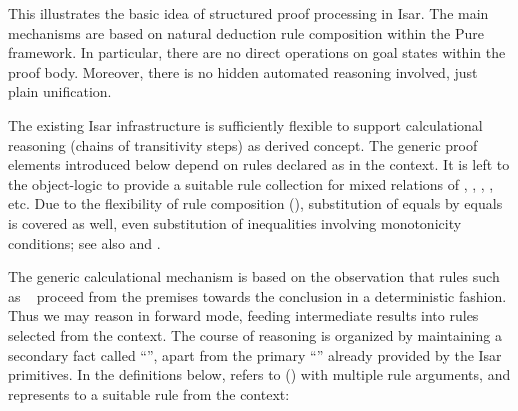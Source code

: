 \begin{isabellebody}
\begin{isamarkuptext}
  \medskip This illustrates the basic idea of structured proof
  processing in Isar.  The main mechanisms are based on natural
  deduction rule composition within the Pure framework.  In
  particular, there are no direct operations on goal states within the
  proof body.  Moreover, there is no hidden automated reasoning
  involved, just plain unification.%
\end{isamarkuptext}%
\isamarkuptrue%
%
\isamarkuptrue%
%
\begin{isamarkuptext}%
The existing Isar infrastructure is sufficiently flexible to support
  calculational reasoning (chains of transitivity steps) as derived
  concept.  The generic proof elements introduced below depend on
  rules declared as \hyperlink{attribute.trans}{\mbox{}} in the context.  It is left to
  the object-logic to provide a suitable rule collection for mixed
  relations of , , , ,
   etc.  Due to the flexibility of rule composition
  (), substitution of equals by
  equals is covered as well, even substitution of inequalities
  involving monotonicity conditions; see also \cite[\S6]{Wenzel-PhD}
  and \cite{Bauer-Wenzel:2001}.

  The generic calculational mechanism is based on the observation that
  rules such as ~
  proceed from the premises towards the conclusion in a deterministic
  fashion.  Thus we may reason in forward mode, feeding intermediate
  results into rules selected from the context.  The course of
  reasoning is organized by maintaining a secondary fact called
  ``\hyperlink{fact.calculation}{\mbox{}}'', apart from the primary ``\hyperlink{fact.this}{\mbox{}}''
  already provided by the Isar primitives.  In the definitions below,
  \hyperlink{attribute.OF}{\mbox{}} refers to \hyperlink{inference.resolution}{\mbox{}}
  () with multiple rule arguments,
  and  represents to a suitable rule from the context:


\end{isamarkuptext}
\end{isabellebody}
